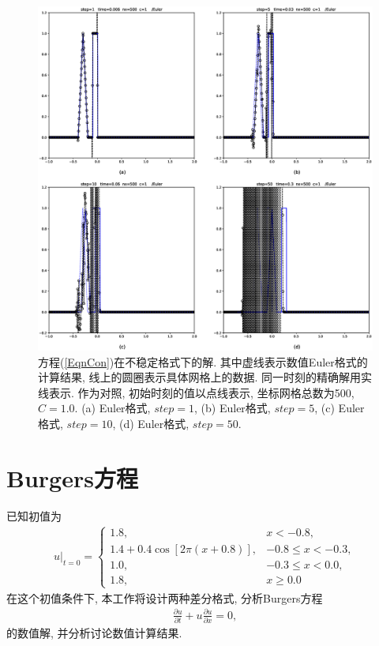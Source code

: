 \documentclass[10.5pt
]{article}
\begin{document}
\begin{figure}[htb]
	\centering
	\includegraphics[width=\textwidth]{hw2_1_euler.eps}
	\caption{方程(\ref{EqnCon})在不稳定格式下的解. 其中虚线表示数值Euler格式的计算结果, 线上的圆圈表示具体网格上的数据. 同一时刻的精确解用实线表示. 作为对照, 初始时刻的值以点线表示, 坐标网格总数为500, $C = 1.0$. (a) Euler格式, $step = 1$, (b)  Euler格式, $step = 5$, (c)  Euler格式, $step = 10$, (d) Euler格式, $step = 50$.} \label{fig14}
\end{figure}

\section{Burgers方程}
已知初值为
\begin{align}
u|_{t=0} = \left\{\begin{array}{ll} 1.8, & x < -0.8,
\\
1.4 + 0.4 \cos\left[2 \pi (x + 0.8) \right], & -0.8 \le x < -0.3,
\\
1.0, & -0.3 \le x < 0.0,
\\
1.8, & x \ge 0.0
\end{array} \right.
\end{align}
在这个初值条件下, 本工作将设计两种差分格式, 分析Burgers方程
\begin{align}
\frac{\partial u}{\partial t} + u \frac{\partial u}{\partial x} = 0, \label{EqnBurgers}
\end{align}
的数值解, 并分析讨论数值计算结果. 
\end{document}
